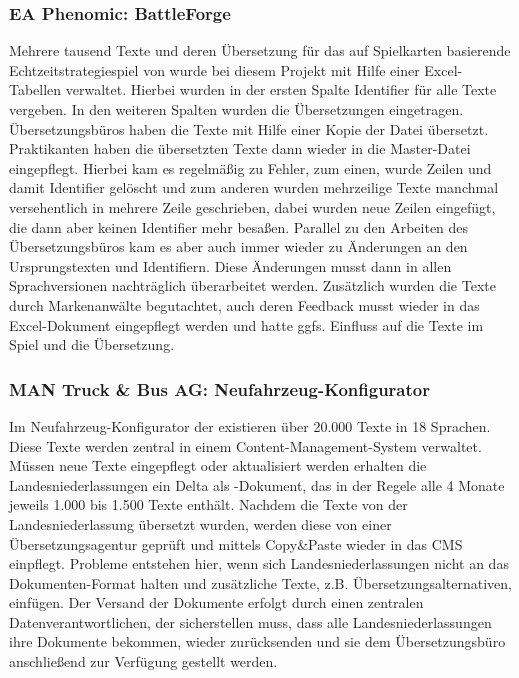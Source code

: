 \subsubsection{EA Phenomic: BattleForge}

Mehrere tausend Texte und deren Übersetzung für das auf Spielkarten basierende Echtzeitstrategiespiel  von  wurde bei diesem Projekt mit Hilfe einer Excel-Tabellen verwaltet. Hierbei wurden in der ersten Spalte Identifier für alle Texte vergeben. In den weiteren Spalten wurden die Übersetzungen eingetragen. Übersetzungsbüros haben die Texte mit Hilfe einer Kopie der Datei übersetzt. Praktikanten haben die übersetzten Texte dann wieder in die Master-Datei eingepflegt. Hierbei kam es regelmäßig zu Fehler, zum einen, wurde Zeilen und damit Identifier gelöscht und zum anderen wurden mehrzeilige Texte manchmal versehentlich in mehrere Zeile geschrieben, dabei wurden neue Zeilen eingefügt, die dann aber keinen Identifier mehr besaßen. Parallel zu den Arbeiten des Übersetzungsbüros kam es aber auch immer wieder zu Änderungen an den Ursprungstexten und Identifiern. Diese Änderungen musst dann in allen Sprachversionen nachträglich überarbeitet werden. Zusätzlich wurden die Texte durch Markenanwälte begutachtet, auch deren Feedback musst wieder in das Excel-Dokument eingepflegt werden und hatte ggfs. Einfluss auf die Texte im Spiel und die Übersetzung.

\subsubsection{MAN Truck \& Bus AG: Neufahrzeug-Konfigurator}

Im Neufahrzeug-Konfigurator der  existieren über 20.000 Texte in 18 Sprachen. Diese Texte werden zentral in einem Content-Management-System verwaltet. Müssen neue Texte eingepflegt oder aktualisiert werden erhalten die Landesniederlassungen ein Delta als -Dokument, das in der Regele alle 4 Monate jeweils 1.000 bis 1.500 Texte enthält. Nachdem die Texte von der Landesniederlassung übersetzt wurden, werden diese von einer Übersetzungsagentur geprüft und mittels Copy\&Paste wieder in das CMS einpflegt.  Probleme entstehen hier, wenn sich Landesniederlassungen nicht an das Dokumenten-Format halten und zusätzliche Texte, z.B. Übersetzungsalternativen, einfügen. Der Versand der Dokumente erfolgt durch einen zentralen Datenverantwortlichen, der sicherstellen muss, dass alle Landesniederlassungen ihre Dokumente bekommen, wieder zurücksenden und sie dem Übersetzungsbüro anschließend zur Verfügung gestellt werden.

